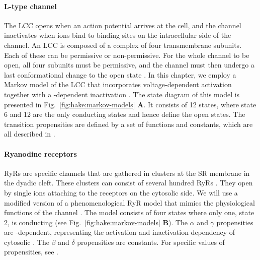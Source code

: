 \paragraph*{L-type \Ca channel}
\label{sec:hake:lcc}
The LCC opens when an action potential arrives at the cell, and the
channel inactivates when \Ca ions bind to binding sites on the
intracellular side of the channel. An LCC is composed of a complex of
four transmembrane subunits. Each of these can be permissive or
non-permissive. For the whole channel to be open, all four subunits
must be permissive, and the channel must then undergo a last
conformational change to the open state \cite{Hille2001}. In this
chapter, we employ a Markov model of the LCC that incorporates
voltage-dependent activation together with a \Ca-dependent
inactivation \cite{JafriRiceWinslow1998,GreensteinWinslow2002}. The state
diagram of this model is presented in
Fig.~\ref{fig:hake:markov-models} \textbf{A}. It consists of 12
states, where state 6 and 12 are the only conducting states and hence
define the open states. The transition propensities are defined by a
set of functions and constants, which are all described in
\citet{GreensteinWinslow2002}.\par

\paragraph*{Ryanodine receptors}
\label{sec:hake:ryr}
 RyRs are \Ca specific channels that are
gathered in clusters at the SR membrane in the dyadic cleft. These
clusters can consist of several hundred RyRs
\cite{BeuckelmannWier1988,Franzini-ArmstrongProtasiRamesh1999}. They
open by single \Ca ions attaching to the receptors on the cytosolic
side. We will use a modified version of a phenomenological RyR model
that mimics the physiological functions of the channel
\cite{SternSongEtAl1999}. The model consists of four states where only
one, state 2, is conducting (see Fig.~\ref{fig:hake:markov-models}
\textbf{B}). The $\alpha$ and $\gamma$ propensities are \Ca-dependent,
representing the activation and inactivation dependency of cytosolic
\CaC. The $\beta$ and $\delta$ propensities are constants. For
specific values of propensities, see \citet{SternSongEtAl1999}.\par


